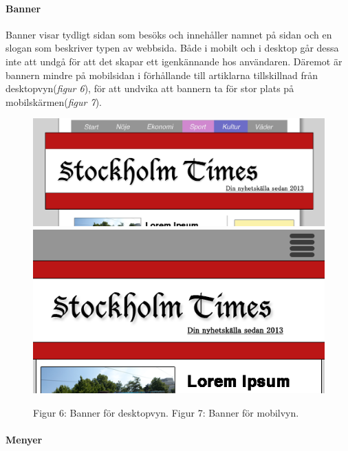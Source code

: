\documentclass[11pt]{article}
\begin{document}
\paragraph{Banner}\mbox{}

Banner visar tydligt sidan som besöks och innehåller namnet på sidan och en slogan som beskriver typen av webbsida. Både i mobilt och i desktop går dessa inte att undgå för att det skapar ett igenkännande hos användaren. Däremot är bannern mindre på mobilsidan i förhållande till artiklarna tillskillnad från desktopvyn(\textit{figur 6}), för att undvika att bannern ta för stor plats på mobilskärmen(\textit{figur 7}).
\\
\begin{figure}[H]
\centerline{%
\includegraphics[scale=0.258]{pics/bannerdesktop.png}\hspace{2em}%
\includegraphics[scale=0.40]{pics/bannermobil.png}%
}
\vspace{0.3cm}
\hspace{0.15cm}Figur 6: Banner för desktopvyn.\hspace{4.4cm} Figur 7: Banner för mobilvyn.

\end{figure}

\paragraph{Menyer}\mbox{}
\end{document}
